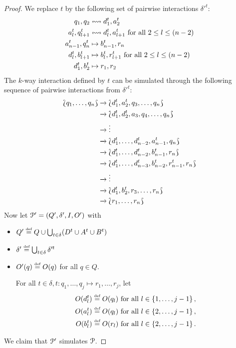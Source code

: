 \begin{proof}
	We replace $t$ by the following set of pairwise interactions $\delta'^t$:
	\begin{align*}
		q_1, q_2 & \leftrightsquigarrow  d^t_{1}, a^t_{2} \\
		a^t_{l}, q^t_{l+1} & \leftrightsquigarrow  d^t_{l}, a^t_{l+1} \text{ for all } 2 \leq l \leq (n-2) \\
		a^t_{n-1}, q^t_{n} & \mapsto b^t_{n-1}, r_{n} \\
		d^t_l, b^t_{l+1} & \mapsto b^t_l, r^t_{l+1}  \text{ for all } 2 \leq l \leq (n-2) \\
		d^t_1, b^t_2 & \mapsto r_1, r_2
	\end{align*}
	The $k$-way interaction defined by $t$ can be simulated through the following 
	sequence of pairwise interactions from $\delta'^t$:
	\begin{align*}
	 \Lbag q_1, \ldots, q_n\Rbag & \xrightarrow{} \Lbag d^t_1, a^t_2, q_3, \ldots, q_n\Rbag \\
	                             & \xrightarrow{} \Lbag d^t_1, d^t_2, a_3, q_4, \ldots, q_n\Rbag \\
	                             & \xrightarrow{} \vdots \\
	                             & \xrightarrow{} \Lbag d^t_1, \ldots, d^t_{n-2}, a^t_{n-1}, q_n\Rbag \\
	                             & \xrightarrow{} \Lbag d^t_1, \ldots, d^t_{n-2}, b^t_{n-1}, r_n\Rbag \\
	                             & \xrightarrow{} \Lbag d^t_1, \ldots, d^t_{n-3}, b^t_{n-2}, r^t_{n-1}, r_n\Rbag \\
	                             & \xrightarrow{} \vdots \\
	                             & \xrightarrow{} \Lbag d^t_1, b^t_2, r_3, \ldots, r_n\Rbag \\
	                             & \xrightarrow{} \Lbag r_1, \ldots, r_n\Rbag
	\end{align*}
	Now let $\mathcal{P}' =(Q', \delta', I, O')$ with
	\begin{itemize}
		\item $Q' \stackrel{\scriptscriptstyle\text{def}}{=} Q \cup \bigcup_{t \in \delta} (D^t \cup A^t \cup B^t)$
		\item $\delta' \stackrel{\scriptscriptstyle\text{def}}{=} \bigcup_{t \in \delta} \delta'^t$
		\item $O'(q) \stackrel{\scriptscriptstyle\text{def}}{=} O(q)$ for all $q \in Q$.

		      For all 
		      $t \in \delta, t \colon q_1, \ldots, q_j \mapsto r_1, \ldots, r_j$, let
		      \begin{align*}
		      O(d^t_l) & \stackrel{\scriptscriptstyle\text{def}}{=} O(q_l) \text{ for all } l \in \left\{1, \ldots, j-1\right\}, \\
		      O(a^t_l) & \stackrel{\scriptscriptstyle\text{def}}{=} O(q_l) \text{ for all } l \in \left\{2, \ldots, j-1\right\}, \\
		      O(b^t_l) & \stackrel{\scriptscriptstyle\text{def}}{=} O(r_l) \text{ for all } l \in \left\{2, \ldots, j-1\right\}.	      
		      \end{align*}
	\end{itemize}
	We claim that $\mathcal{P}'$ simulates $\mathcal{P}$.
\end{proof}
